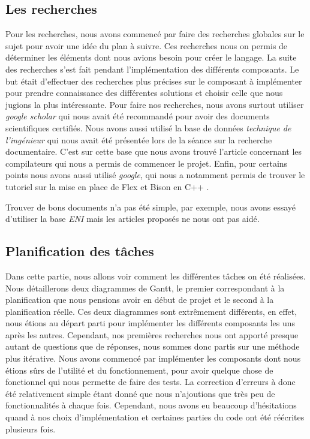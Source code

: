 \documentclass[a4paper]{article}%
\begin{document}
\subsection{Les recherches}

Pour les recherches, nous avons commencé par faire des recherches globales sur
le sujet pour avoir une idée du plan à suivre. Ces recherches nous on permis de
déterminer les éléments dont nous avions besoin pour créer le langage. La suite
des recherches s'est fait pendant l'implémentation des différents composants. Le
but était d'effectuer des recherches plus précises sur le composant à
implémenter pour prendre connaissance des différentes solutions et choisir
celle que nous jugions la plus intéressante. Pour faire nos recherches, nous
avons surtout utiliser \textit{google scholar} qui nous avait été recommandé
pour avoir des documents scientifiques certifiés. Nous avons aussi utilisé la
base de données \textit{technique de l'ingénieur} qui nous avait été présentée
lors de la séance sur la recherche documentaire. C'est sur cette base que nous
avons trouvé l'article concernant les compilateurs \cite{compilerTICH} qui nous
a permis de commencer le projet. Enfin, pour certains points nous avons aussi
utilisé \textit{google}, qui nous a notamment permis de trouver le tutoriel sur
la mise en place de Flex et Bison en C++ \cite{cppparsing}.

Trouver de bons documents n'a pas été simple, par exemple, nous avons essayé
d'utiliser la base \textit{ENI} mais les articles proposés ne nous ont pas aidé.

\clearpage
\subsection{Planification des tâches}

Dans cette partie, nous allons voir comment les différentes tâches on été
réalisées. Nous détaillerons deux diagrammes de Gantt, le premier correspondant
à la planification que nous pensions avoir en début de projet et le second à la
planification réelle. Ces deux diagrammes sont extrêmement différents, en effet,
nous étions au départ parti pour implémenter les différents composants les uns
après les autres. Cependant, nos premières recherches nous ont apporté presque
autant de questions que de réponses, nous sommes donc partis sur une méthode plus
itérative. Nous avons commencé par implémenter les composants dont nous étions
sûrs de l'utilité et du fonctionnement, pour avoir quelque chose de fonctionnel
qui nous permette de faire des tests. La correction d'erreurs à donc été
relativement simple étant donné que nous n'ajoutions que très peu de
fonctionnalités à chaque fois. Cependant, nous avons eu beaucoup d'hésitations
quand à nos choix d'implémentation et certaines parties du code ont été
réécrites plusieurs fois.\\
\end{document}
